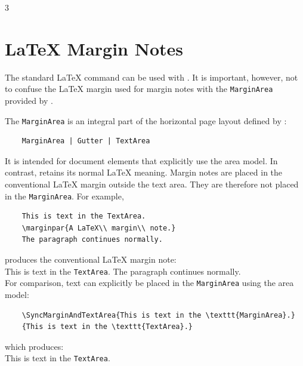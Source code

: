 \documentclass[
11pt,
a4paper,
oneside
]{scrbook}
\begin{document}
{\begin{verbatim}
\end{verbatim}
\begin{FullArea}
	\lipsum[1][1-5]
	\begin{multicols}{3}
		\lipsum[1][6-15]
	\end{multicols}
	\lipsum[1][16-30]
\end{FullArea}


\section{\LaTeX{} Margin Notes}

The standard \LaTeX{} command \texttt{\string\marginpar} can be used
with \mdlayout{}. It is important, however, not to confuse the
\LaTeX{} margin used for margin notes with the \texttt{MarginArea}
provided by \mdlayout{}.

The \texttt{MarginArea} is an integral part of the horizontal page
layout defined by \mdlayout{}:
\begin{verbatim}
	MarginArea | Gutter | TextArea
\end{verbatim}
It is intended for document elements that explicitly use the
\mdlayout{} area model.
In contrast, \texttt{\string\marginpar} retains its normal \LaTeX{}
meaning. Margin notes are placed in the conventional \LaTeX{} margin
outside the text area. They are therefore not placed in the
\mdlayout{} \texttt{MarginArea}.
For example,
\begin{verbatim}
	This is text in the TextArea.
	\marginpar{A LaTeX\\ margin\\ note.}
	The paragraph continues normally.
\end{verbatim}
produces the conventional \LaTeX{} margin note:\\[1ex]
This is text in the \texttt{TextArea}.
The paragraph continues normally.\\[1ex]

\noindent For comparison, text can explicitly be placed in the
\texttt{MarginArea} using the \mdlayout{} area model:
\begin{verbatim}
	\SyncMarginAndTextArea{This is text in the \texttt{MarginArea}.}
	{This is text in the \texttt{TextArea}.}
\end{verbatim}
which produces:\\[1ex]
{This is text in the \texttt{TextArea}.}

}
\end{document}
